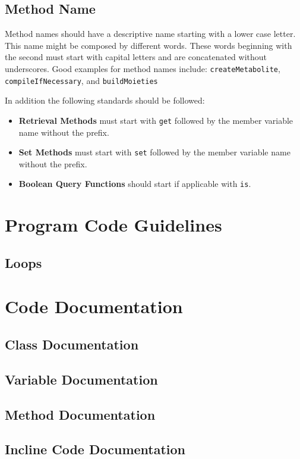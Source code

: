 \documentclass[12pt]{book}
\begin{document}
\section{Method Name}
Method names should have a descriptive name starting with a lower case
letter. This name might be composed by different words. These words
beginning with the second must start with capital letters and
are concatenated without underscores. Good examples for method names
include: 
   {\tt createMetabolite}, {\tt compileIfNecessary}, and {\tt buildMoieties}

In addition the following standards should be followed:  

\begin{itemize}
\item {\bf Retrieval Methods} must start with {\tt get} followed by
  the member variable name without the prefix.
\item {\bf Set Methods} must start with {\tt set} followed by
  the member variable name without the prefix.
\item {\bf Boolean Query Functions} should start if applicable with
  {\tt is}.
\end{itemize}

\chapter{Program Code Guidelines}
\section{Loops}


\chapter{Code Documentation}
\section{Class Documentation}
\section{Variable Documentation}
\section{Method Documentation}
\section{Incline Code Documentation}
\end{document}
